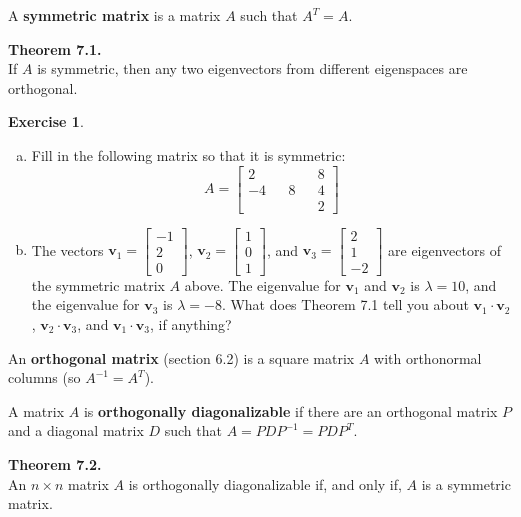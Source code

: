 \documentclass[10pt]{book}
\newcommand{\boxcolor}{gray!30}
\newenvironment{boxthm}{\begin{mdframed}[backgroundcolor=\boxcolor,nobreak=true]}{\end{mdframed}}
\newenvironment{boxdef}{\begin{mdframed}[backgroundcolor=\boxcolor,linewidth=0pt,nobreak=true]}{\end{mdframed}}
\theoremstyle{definition}
\newtheorem{exercise}{Exercise}[section]
\newcommand{\vect}[1]{\ensuremath{\boldsymbol{\mathbf{#1}}}}
\begin{document}
\begin{boxdef}
	A \textbf{symmetric matrix} is a matrix $A$ such that $A^T=A$.
\end{boxdef}
\vspace{-1em}
\begin{boxthm}
	\textbf{Theorem 7.1.} \\
	If $A$ is symmetric, then any two eigenvectors from different eigenspaces are orthogonal.
\end{boxthm}


\begin{exercise} %
	\begin{enumerate}[(a)]
		\item Fill in the following matrix so that it is symmetric:
		\begingroup
		\renewcommand{\arraystretch}{1.5}
		$$ A = \begin{bmatrix}2&&  &&8\\-4&&8&&4\\ && &&2\end{bmatrix} $$
		\endgroup
		\item The vectors $\vect{v}_1=\begin{bmatrix}-1\\2\\0\end{bmatrix}$, $\vect{v}_2=\begin{bmatrix}1\\0\\1\end{bmatrix}$, and $\vect{v}_3=\begin{bmatrix}2\\1\\-2\end{bmatrix}$ are eigenvectors of the symmetric matrix $A$ above. The eigenvalue for $\vect{v}_1$ and $\vect{v}_2$ is $\lambda=10$, and the eigenvalue for $\vect{v}_3$ is $\lambda=-8$. What does Theorem 7.1 tell you about $\vect{v}_1\cdot\vect{v}_2$, $\vect{v}_2\cdot\vect{v}_3$, and $\vect{v}_1\cdot\vect{v}_3$, if anything?
	\end{enumerate}
\end{exercise}
\vspace{2in}


\begin{boxdef}
	An \textbf{orthogonal matrix} (section 6.2) is a square matrix $A$ with orthonormal columns (so $A^{-1}=A^T$). \par
	A matrix $A$ is \textbf{orthogonally diagonalizable} if there are an orthogonal matrix $P$ and a diagonal matrix $D$ such that $A=PDP^{-1}=PDP^T$.
\end{boxdef}
\vspace{-1em}
\begin{boxthm}
	\textbf{Theorem 7.2.} \\
	An $n\times n$ matrix $A$ is orthogonally diagonalizable if, and only if, $A$ is a symmetric matrix.
\end{boxthm}
\end{document}
